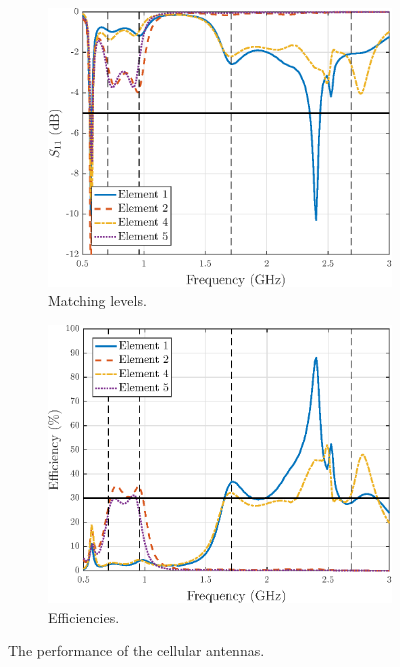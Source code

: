 \begin{figure}[H]
    \centering
    \begin{subfigure}[b]{0.49\textwidth}
        \includegraphics[width=\textwidth]{img/diversity_match_orig.eps}
        \caption{Matching levels.}
        \label{fig:div_match_orig}
    \end{subfigure}
    \begin{subfigure}[b]{0.49\textwidth}
        \includegraphics[width=\textwidth]{img/diversity_eff_ideal_orig.eps}
        \caption{Efficiencies.}
        \label{fig:div_eff_orig}
    \end{subfigure}
    \caption{The performance of the cellular antennas.}
    \label{fig:div_performance_orig}
    \vspace{-15pt}
\end{figure}

